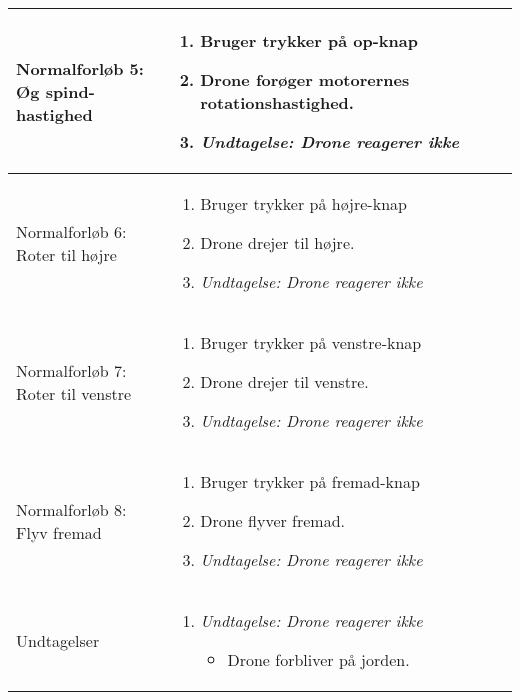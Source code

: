\documentclass[Main]{subfiles}
\begin{document}
\begin{longtable}{| p{} p{}|}
\parbox[t]{0.25\textwidth}{Normalforløb 5: \\ Øg spind-hastighed} &	\vspace{-8mm}
	\begin{enumerate}[noitemsep,nolistsep,leftmargin=*]
	\item Bruger trykker på op-knap
	\item Drone forøger motorernes rotationshastighed.
	\item[] \textit{Undtagelse: Drone reagerer ikke}
	\end{enumerate} \\ \hline
	
\parbox[t]{0.25\textwidth}{Normalforløb 6: \\ Roter til højre} &	\vspace{-8mm}
	\begin{enumerate}[noitemsep,nolistsep,leftmargin=*]
	\item Bruger trykker på højre-knap
	\item Drone drejer til højre.
	\item[] \textit{Undtagelse: Drone reagerer ikke}
	\end{enumerate} \\ \hline
	
\parbox[t]{0.25\textwidth}{Normalforløb 7: \\ Roter til venstre} &	\vspace{-8mm}
	\begin{enumerate}[noitemsep,nolistsep,leftmargin=*]
	\item Bruger trykker på venstre-knap
	\item Drone drejer til venstre.
	\item[] \textit{Undtagelse: Drone reagerer ikke}
	\end{enumerate} \\ \hline
	
\parbox[t]{0.25\textwidth}{Normalforløb 8: \\ Flyv fremad} &	\vspace{-8mm}
	\begin{enumerate}[noitemsep,nolistsep,leftmargin=*]
	\item Bruger trykker på fremad-knap
	\item Drone flyver fremad.
	\item[] \textit{Undtagelse: Drone reagerer ikke}
	\end{enumerate} \\ \hline

Undtagelser & \vspace{-8mm}
	\begin{enumerate}[noitemsep,nolistsep,leftmargin=*]
	\item[2.] \textit{Undtagelse: Drone reagerer ikke}
		\begin{itemize}
		\item Drone forbliver på jorden.
		\end{itemize}
	\end{enumerate} \\
\hline
\end{longtable}
\end{document}
